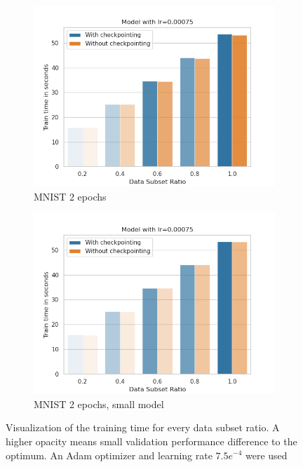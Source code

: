\begin{figure}[h]
\begin{subfigure}[b]{0.24\textwidth}
        \centering
        \includegraphics[width=\textwidth]{figures/22_07/2ep/train_subset_0.00075.png}
        \caption{MNIST 2 epochs}
        \label{fig:19c}
    \end{subfigure}
    \begin{subfigure}[b]{0.24\textwidth}
        \centering
        \includegraphics[width=\textwidth]{figures/22_07/2ep_smaller/train_subset_0.00075.png}
        \caption{MNIST 2 epochs, small model}
        \label{fig:19d}
    \end{subfigure}
    \caption{Visualization of the training time for every data subset ratio. A higher opacity means small validation performance difference to the optimum. An Adam optimizer and learning rate $7.5e^{-4}$ were used}
    \label{fig:19}
\end{figure}